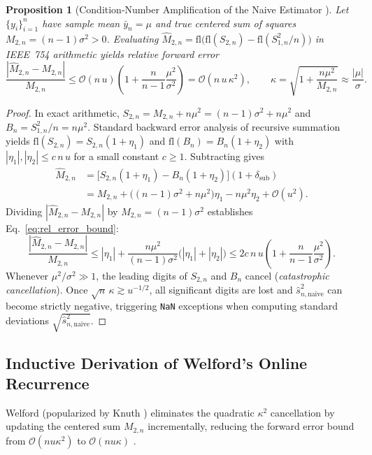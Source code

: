 \documentclass[oneside,noexaminfo,english]{sapthesis}
\numberwithin{equation}{section}
\numberwithin{figure}{section}
\numberwithin{table}{section}
\theoremstyle{compactplain}
\newtheorem{proposition}[theorem]{Proposition}
\theoremstyle{compactdef}
\theoremstyle{compactrem}
\begin{document}
\begin{proposition}[Condition-Number Amplification of the Naive Estimator \cite{chan1983,higham2002}]
\label{prop:cancellation}
Let $\{y_i\}_{i=1}^n$ have sample mean $\bar{y}_n = \mu$ and true centered sum of squares $M_{2,n} = (n-1)\sigma^2 > 0$. Evaluating $\widehat{M}_{2,n} = \mathrm{fl}\bigl(\mathrm{fl}(S_{2,n}) - \mathrm{fl}(S_{1,n}^2 / n)\bigr)$ in IEEE~754 arithmetic yields relative forward error
\begin{equation}
    \label{eq:rel_error_bound}
    \frac{|\widehat{M}_{2,n} - M_{2,n}|}{M_{2,n}} \le \mathcal{O}(n\,u)\!\left( 1 + \frac{n}{n-1}\frac{\mu^2}{\sigma^2} \right) = \mathcal{O}\!\left( n\,u\,\kappa^2 \right), \qquad \kappa = \sqrt{1 + \frac{n\mu^2}{M_{2,n}}} \approx \frac{|\mu|}{\sigma}.
\end{equation}
\end{proposition}
\begin{proof}
In exact arithmetic, $S_{2,n} = M_{2,n} + n\mu^2 = (n-1)\sigma^2 + n\mu^2$ and $B_n = S_{1,n}^2/n = n\mu^2$. Standard backward error analysis of recursive summation \cite{higham2002} yields $\mathrm{fl}(S_{2,n}) = S_{2,n}(1 + \eta_1)$ and $\mathrm{fl}(B_n) = B_n(1 + \eta_2)$ with $|\eta_1|, |\eta_2| \le c\,n\,u$ for a small constant $c \ge 1$. Subtracting gives
\begin{align*}
    \widehat{M}_{2,n} &= \bigl[ S_{2,n}(1 + \eta_1) - B_n(1 + \eta_2) \bigr](1 + \delta_{\mathrm{sub}}) \\
    &= M_{2,n} + \bigl((n-1)\sigma^2 + n\mu^2\bigr)\eta_1 - n\mu^2\eta_2 + \mathcal{O}(u^2).
\end{align*}
Dividing $|\widehat{M}_{2,n} - M_{2,n}|$ by $M_{2,n} = (n-1)\sigma^2$ establishes Eq.~\eqref{eq:rel_error_bound}:
\begin{equation*}
    \frac{|\widehat{M}_{2,n} - M_{2,n}|}{M_{2,n}} \le |\eta_1| + \frac{n\mu^2}{(n-1)\sigma^2}\bigl(|\eta_1| + |\eta_2|\bigr) \le 2 c\,n\,u \left( 1 + \frac{n}{n-1}\frac{\mu^2}{\sigma^2} \right).
\end{equation*}
Whenever $\mu^2 / \sigma^2 \gg 1$, the leading digits of $S_{2,n}$ and $B_n$ cancel (\emph{catastrophic cancellation}). Once $\sqrt{n}\,\kappa \gtrsim u^{-1/2}$, all significant digits are lost and $\hat{s}_{n,\mathrm{naive}}^2$ can become strictly negative, triggering \texttt{NaN} exceptions when computing standard deviations $\sqrt{\hat{s}_{n,\mathrm{naive}}^2}$.
\end{proof}

\subsection{Inductive Derivation of Welford's Online Recurrence}
Welford \cite{welford1962} (popularized by Knuth \cite{knuth1997}) eliminates the quadratic $\kappa^2$ cancellation by updating the centered sum $M_{2,n}$ incrementally, reducing the forward error bound from $\mathcal{O}(n u \kappa^2)$ to $\mathcal{O}(n u \kappa)$ \cite{chan1983}.
\end{document}
